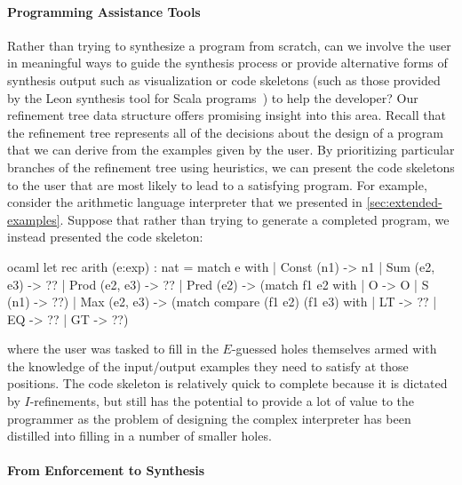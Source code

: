 \paragraph{Programming Assistance Tools}
Rather than trying to synthesize a program from scratch, can we involve the user in meaningful ways to guide the synthesis process or provide alternative forms of synthesis output such as visualization or code skeletons (such as those provided by the Leon synthesis tool for Scala programs~\citep{kneuss-oopsla-2013}) to help the developer?
Our refinement tree data structure offers promising insight into this area.
Recall that the refinement tree represents all of the decisions about the design of a program that we can derive from the examples given by the user.
By prioritizing particular branches of the refinement tree using heuristics, we can present the code skeletons to the user that are most likely to lead to a satisfying program.
For example, consider the arithmetic language interpreter that we presented in \autoref{sec:extended-examples}.
Suppose that rather than trying to generate a completed program, we instead presented the code skeleton:
\begin{center}
  \begin{cminted}{ocaml}
let rec arith (e:exp) : nat =
  match e with
  | Const (n1) -> n1
  | Sum (e2, e3) -> ??
  | Prod (e2, e3) -> ??
  | Pred (e2) -> (match f1 e2 with
                 | O -> O
                 | S (n1) -> ??)
  | Max (e2, e3) -> (match compare (f1 e2) (f1 e3) with
                    | LT -> ??
                    | EQ -> ??
                    | GT -> ??)
  \end{cminted}
\end{center}
where the user was tasked to fill in the $E$-guessed holes themselves armed with the knowledge of the input/output examples they need to satisfy at those positions.
The code skeleton is relatively quick to complete because it is dictated by $I$-refinements, but still has the potential to provide a lot of value to the programmer as the problem of designing the complex interpreter has been distilled into filling in a number of smaller holes.

\paragraph{From Enforcement to Synthesis}

